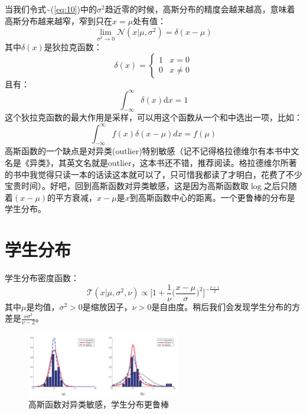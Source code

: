 \documentclass[10pt,a4paper,UTF8]{article}
\begin{document}
当我们令式\textasciitilde{}(\ref{eq:10})中的\(\sigma^{2}\)趋近零的时候，高斯分布的精度会越来越高，意味着高斯分布越来越窄，窄到只在\(x=\mu\)处有值：
\begin{equation}
\label{eq:12}
\lim_{\sigma^{2}\to 0} \mathcal{N}(x|\mu,\sigma^{2}) = \delta(x-\mu)
\end{equation}
其中\(\delta(x)\)是狄拉克函数：
\begin{equation}
\label{eq:13}
\delta(x) =
\begin{cases}
1 & x = 0 \\
0 & x\neq 0
\end{cases}
\end{equation}
且有：
\begin{equation}
\label{eq:14}
\int_{-\infty}^{\infty} \delta(x) \mathrm{d}x = 1
\end{equation}
这个狄拉克函数的最大作用是采样，可以用这个函数从一个和中选出一项，比如：
\begin{equation}
\label{eq:15}
\int_{-\infty}^{\infty}f(x)\delta(x-\mu)dx = f(\mu)
\end{equation}
高斯函数的一个缺点是对异类(outlier)特别敏感（记不记得格拉德维尔有本书中文名是《异类》，其英文名就是outlier，这本书还不错，推荐阅读。格拉德维尔所著的书中我觉得只读一本的话读这本就可以了，只可惜我都读了才明白，花费了不少宝贵时间）。好吧，回到高斯函数对异类敏感，这是因为高斯函数取\(\log\)之后只随着\((x-\mu)\)的平方衰减，\(x-\mu\)是\(x\)到高斯函数中心的距离。一个更鲁棒的分布是学生分布。
\section{学生分布}
\label{sec:org30cbd6c}


学生分布密度函数：
\begin{equation}
\label{eq:16}
\mathcal{T}(x|\mu,\sigma^{2},\nu) \propto \bigg[ 1 + \frac{1}{\nu}\big(\frac{x-\mu}{\sigma}\big)^{2} \bigg]^{-\frac{\nu + 1}{2}}
\end{equation}
其中\(\mu\)是均值，\(\sigma^{2} > 0\)是缩放因子，\(\nu > 0\)是自由度。稍后我们会发现学生分布的方差是\(\frac{\nu\sigma^{2}}{\nu-2}\)。
\begin{figure}[htbp]
\centering
\includegraphics[width=0.6\textwidth]{../../img/computer_mlapp/20170524mlappfigure2dot7.png}
\caption{\label{fig:org8c1a47b}
高斯函数对异类敏感，学生分布更鲁棒}
\end{figure}
\end{document}
